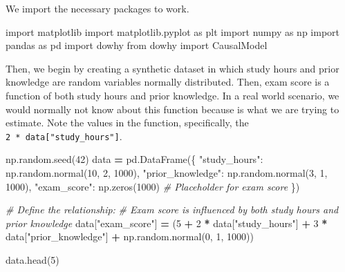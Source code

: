 \documentclass[
  12pt,
]{book}
\newenvironment{Shaded}{\begin{snugshade}}{\end{snugshade}}
\newcommand{\CommentTok}[1]{\textcolor[rgb]{0.56,0.35,0.01}{\textit{#1}}}
\newcommand{\DecValTok}[1]{\textcolor[rgb]{0.00,0.00,0.81}{#1}}
\newcommand{\ImportTok}[1]{#1}
\newcommand{\NormalTok}[1]{#1}
\newcommand{\OperatorTok}[1]{\textcolor[rgb]{0.81,0.36,0.00}{\textbf{#1}}}
\newcommand{\StringTok}[1]{\textcolor[rgb]{0.31,0.60,0.02}{#1}}
\begin{document}
We import the necessary packages to work.

\begin{Shaded}
\begin{Highlighting}[]
\ImportTok{import}\NormalTok{ matplotlib}
\ImportTok{import}\NormalTok{ matplotlib.pyplot }\ImportTok{as}\NormalTok{ plt}
\ImportTok{import}\NormalTok{ numpy }\ImportTok{as}\NormalTok{ np}
\ImportTok{import}\NormalTok{ pandas }\ImportTok{as}\NormalTok{ pd}
\ImportTok{import}\NormalTok{ dowhy}
\ImportTok{from}\NormalTok{ dowhy }\ImportTok{import}\NormalTok{ CausalModel}
\end{Highlighting}
\end{Shaded}

Then, we begin by creating a synthetic dataset in which study hours and prior knowledge are random variables normally distributed. Then, exam score is a function of both study hours and prior knowledge. In a real world scenario, we would normally not know about this function because is what we are trying to estimate. Note the values in the function, specifically, the \texttt{2\ *\ data{[}"study\_hours"{]}}.

\begin{Shaded}
\begin{Highlighting}[]
\NormalTok{np.random.seed(}\DecValTok{42}\NormalTok{)}
\NormalTok{data }\OperatorTok{=}\NormalTok{ pd.DataFrame(\{}
    \StringTok{"study\_hours"}\NormalTok{: np.random.normal(}\DecValTok{10}\NormalTok{, }\DecValTok{2}\NormalTok{, }\DecValTok{1000}\NormalTok{),  }
    \StringTok{"prior\_knowledge"}\NormalTok{: np.random.normal(}\DecValTok{3}\NormalTok{, }\DecValTok{1}\NormalTok{, }\DecValTok{1000}\NormalTok{),}
    \StringTok{"exam\_score"}\NormalTok{: np.zeros(}\DecValTok{1000}\NormalTok{)  }\CommentTok{\# Placeholder for exam score}
\NormalTok{\})}

\CommentTok{\# Define the relationship: }
\CommentTok{\# Exam score is influenced by both study hours and prior knowledge}
\NormalTok{data[}\StringTok{"exam\_score"}\NormalTok{] }\OperatorTok{=}\NormalTok{ (}\DecValTok{5} \OperatorTok{+} \DecValTok{2} \OperatorTok{*}\NormalTok{ data[}\StringTok{"study\_hours"}\NormalTok{] }
                       \OperatorTok{+} \DecValTok{3} \OperatorTok{*}\NormalTok{ data[}\StringTok{"prior\_knowledge"}\NormalTok{] }
                       \OperatorTok{+}\NormalTok{ np.random.normal(}\DecValTok{0}\NormalTok{, }\DecValTok{1}\NormalTok{, }\DecValTok{1000}\NormalTok{))}

\NormalTok{data.head(}\DecValTok{5}\NormalTok{)}
\end{Highlighting}
\end{Shaded}
\end{document}
